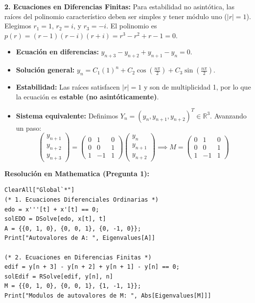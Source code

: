 \begin{sol}
\textbf{2. Ecuaciones en Diferencias Finitas:}
Para estabilidad no asintótica, las raíces del polinomio característico deben ser simples y tener módulo uno ($|r| = 1$). Elegimos $r_1 = 1$, $r_2 = i$, y $r_3 = -i$.
El polinomio es $p(r) = (r - 1)(r - i)(r + i) = r^3 - r^2 + r - 1 = 0$.
\begin{itemize}[label=-]
    \item \textbf{Ecuación en diferencias:} $y_{n+3} - y_{n+2} + y_{n+1} - y_n = 0$.
    \item \textbf{Solución general:} $y_n = C_1 (1)^n + C_2 \cos\left(\frac{n\pi}{2}\right) + C_3 \sin\left(\frac{n\pi}{2}\right)$.
    \item \textbf{Estabilidad:} Las raíces satisfacen $|r| = 1$ y son de multiplicidad 1, por lo que la ecuación es \textbf{estable (no asintóticamente)}.
    \item \textbf{Sistema equivalente:} Definimos $Y_n = (y_n, y_{n+1}, y_{n+2})^T \in \mathbb{R}^3$. Avanzando un paso:
    $$ \begin{pmatrix} y_{n+1} \\ y_{n+2} \\ y_{n+3} \end{pmatrix} = \begin{pmatrix} 0 & 1 & 0 \\ 0 & 0 & 1 \\ 1 & -1 & 1 \end{pmatrix} \begin{pmatrix} y_n \\ y_{n+1} \\ y_{n+2} \end{pmatrix} \implies M = \begin{pmatrix} 0 & 1 & 0 \\ 0 & 0 & 1 \\ 1 & -1 & 1 \end{pmatrix} $$
\end{itemize}

\textbf{Resolución en Mathematica (Pregunta 1):}
\begin{lstlisting}
ClearAll["Global`*"]
(* 1. Ecuaciones Diferenciales Ordinarias *)
edo = x'''[t] + x'[t] == 0;
solEDO = DSolve[edo, x[t], t]
A = {{0, 1, 0}, {0, 0, 1}, {0, -1, 0}};
Print["Autovalores de A: ", Eigenvalues[A]]

(* 2. Ecuaciones en Diferencias Finitas *)
edif = y[n + 3] - y[n + 2] + y[n + 1] - y[n] == 0;
solEdif = RSolve[edif, y[n], n]
M = {{0, 1, 0}, {0, 0, 1}, {1, -1, 1}};
Print["Modulos de autovalores de M: ", Abs[Eigenvalues[M]]]
\end{lstlisting}
\end{sol}

